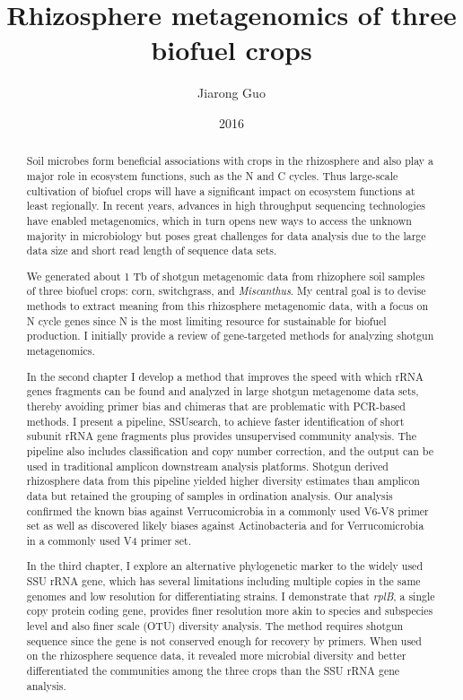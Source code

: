 \documentclass[]{msu-thesis}
\title{Rhizosphere metagenomics of three biofuel crops}
\author{Jiarong Guo}
\date{2016}
\begin{document}
\settypeblocksize{9in}{6.5in}{*}
\setlrmargins{1in}{*}{*}
\setulmargins{1in}{*}{*}
\setheadfoot{\baselineskip}{0.5in}

\frontmatter
\maketitlepage
\begin{abstract}
  
Soil microbes form beneficial associations with crops in the rhizosphere
and also play a major role in ecosystem functions, such as the N and C
cycles. Thus large-scale cultivation of biofuel crops will have a
significant impact on ecosystem functions at least regionally.  In
recent years, advances in high throughput sequencing technologies have
enabled metagenomics, which in turn opens new ways to access the unknown
majority in microbiology but poses great challenges for data analysis
due to the large data size and short read length of sequence data sets.

We generated about 1 Tb of shotgun metagenomic data from rhizophere soil
samples of three biofuel crops: corn, switchgrass, and \textit{Miscanthus}. My
central goal is to devise methods to extract meaning from this
rhizosphere metagenomic data, with a focus on N cycle genes since N is
the most limiting resource for sustainable for biofuel production. I
initially provide a review of gene-targeted methods for analyzing
shotgun metagenomics.

In the second chapter I develop a method that improves the speed with
which rRNA genes fragments can be found and analyzed in large shotgun
metagenome data sets, thereby avoiding primer bias and chimeras that are
problematic with PCR-based methods. I present a pipeline, SSUsearch, to
achieve faster identification of short subunit rRNA gene fragments plus
provides unsupervised community analysis. The pipeline also includes
classification and copy number correction, and the output can be used in
traditional amplicon downstream analysis platforms. Shotgun derived
rhizosphere data from this pipeline yielded higher diversity estimates
than amplicon data but retained the grouping of samples in ordination
analysis. Our analysis confirmed the known bias against Verrucomicrobia
in a commonly used V6-V8 primer set as well as discovered likely biases
against Actinobacteria and for Verrucomicrobia in a commonly used V4
primer set.

In the third chapter, I explore an alternative phylogenetic marker to
the widely used SSU rRNA gene, which has several limitations including
multiple copies in the same genomes and low resolution for
differentiating strains. I demonstrate that \textit{rplB}, a single copy
protein coding gene, provides finer resolution more akin to species and
subspecies level and also finer scale (OTU) diversity analysis. The
method requires shotgun sequence since the gene is not conserved enough
for recovery by primers. When used on the rhizosphere sequence data, it
revealed more microbial diversity and better differentiated the
communities among the three crops than the SSU rRNA gene analysis.


\end{abstract}
\end{document}
